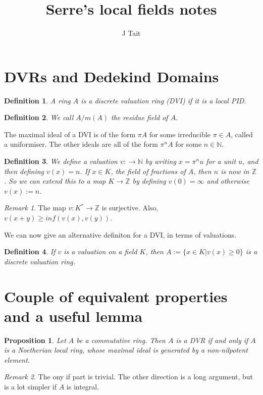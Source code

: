 \documentclass[11pt]{article} %
\title{Serre's local fields notes}
\author{J Tait}
\newtheorem{defn}{Definition}
\newtheorem{prop}{Proposition}
\theoremstyle{remark}\newtheorem*{rem}{Remark}
\begin{document}
\maketitle
\section{DVRs and Dedekind Domains}

\begin{defn}
 A ring $A$ is a discrete valuation ring (DVI) if it is a local PID.
\end{defn}

\begin{defn}
 We call $A/m(A)$ the residue field of $A$.
\end{defn}

The maximal ideal of a DVI is of the form $\pi A$ for some irreducible $\pi \in A$, called a uniformiser.
The other ideals are all of the form $\pi^nA$ for some $n\in \mathbb{N}$.

\begin{defn}
 We define a valuation $v:\rightarrow \mathbb N$ by writing $x=\pi^n u$ for a unit $u$, and then defining $v(x)=n$.
If $x\in K$, the field of fractions of $A$, then $n$ is now in $\mathbb Z$.
So we can extend this to a map $K\rightarrow \mathbb Z$ by defining $v(0)=\infty$ and otherwise $v(x):=n$.
\end{defn}

\begin{rem}
 The map $v:K^*\rightarrow \mathbb Z$ is surjective. Also, $v(x+y) \geq inf(v(x),v(y))$.
\end{rem}

We can now give an alternative definiton for a DVI, in terms of valuations.

\begin{defn}
 If $v$ is a valuation on a field $K$, then $A:=\{x\in K| v(x)\geq 0\}$ is a discrete valuation ring.
\end{defn}

\section{Couple of equivalent properties and a useful lemma}

\begin{prop}
 Let $A$ be a commutative ring.
Then $A$ is a DVR if and only if $A$ is a Noetherian local ring, whose maximal ideal is generated by a non-nilpotent element.
\end{prop}
\begin{rem}
 The ony if part is trivial.
 The other direction is a long argument, but is a lot simpler if $A$ is integral.
\end{rem}
\end{document}
